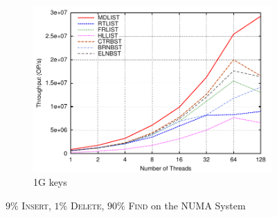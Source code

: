 \documentclass[10pt,conference,compsocconf]{IEEEtran}
\begin{document}
\begin{figure}[t]
\begin{subfigure}{0.32\textwidth}
        \includegraphics[width=1\columnwidth]{./data/amd9ins1Bkey}
      \caption{1G keys}
        \label{fig:1b9ins}
    \end{subfigure}
    \vspace{-0.08in}
 \caption{$9\%$ \textsc{Insert}, $1\%$ \textsc{Delete}, $90\%$ \textsc{Find} on the NUMA System}
    \label{fig:readload}
    \vspace{-0.2in}
\end{figure}
\end{document}
